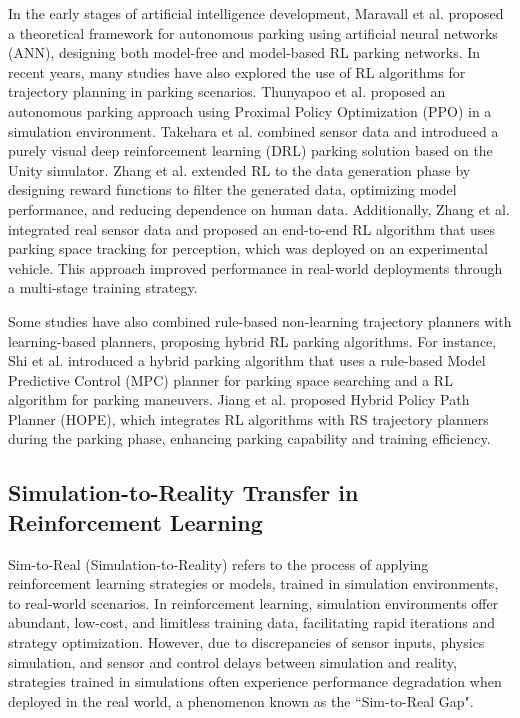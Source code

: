 \documentclass[ conference]{./support/ieeeconf}
\begin{document}
In the early stages of artificial intelligence development, Maravall et al.\cite{maravall2003automatic} proposed a theoretical framework for autonomous parking using artificial neural networks (ANN), designing both model-free and model-based RL parking networks. 
In recent years, many studies have also explored the use of RL algorithms for trajectory planning in parking scenarios. 
Thunyapoo et al.\cite{thunyapoo2020self} proposed an autonomous parking approach using Proximal Policy Optimization (PPO) in a simulation environment. 
Takehara et al.\cite{takehara2021autonomous} combined sensor data and introduced a purely visual deep reinforcement learning (DRL) parking solution based on the Unity simulator. 
Zhang et al.\cite{zhang2020data} extended RL to the data generation phase by designing reward functions to filter the generated data, optimizing model performance, and reducing dependence on human data. Additionally, Zhang et al.\cite{zhang2019e2e} integrated real sensor data and proposed an end-to-end RL algorithm that uses parking space tracking for perception, which was deployed on an experimental vehicle. This approach improved performance in real-world deployments through a multi-stage training strategy.

Some studies have also combined rule-based non-learning trajectory planners with learning-based planners, proposing hybrid RL parking algorithms. 
For instance, Shi et al.\cite{shi2023model} introduced a hybrid parking algorithm that uses a rule-based Model Predictive Control (MPC) planner for parking space searching and a RL algorithm for parking maneuvers. 
Jiang et al. \cite{jiang2024hope} proposed Hybrid Policy Path Planner (HOPE), which integrates RL algorithms with RS trajectory planners during the parking phase, enhancing parking capability and training efficiency.

\subsection{Simulation-to-Reality Transfer in Reinforcement Learning}

Sim-to-Real (Simulation-to-Reality) refers to the process of applying reinforcement learning strategies or models, trained in simulation environments, to real-world scenarios\cite{zhao2020sim}. 
In reinforcement learning, simulation environments offer abundant, low-cost, and limitless training data, facilitating rapid iterations and strategy optimization. 
However, due to discrepancies of sensor inputs, physics simulation, and sensor and control delays\cite{robotics_sim2real_yu2024} between simulation and reality, strategies trained in simulations often experience performance degradation when deployed in the real world, a phenomenon known as the “Sim-to-Real Gap".
\end{document}
